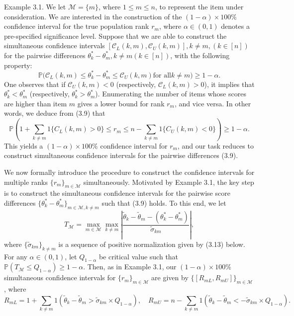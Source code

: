 Example 3.1. We let \(\mathcal{M} = \{m\}\), where \(1 \leq m \leq n\), to represent the item under consideration. We are interested in the construction of the \((1 - \alpha) \times 100\%\) confidence interval for the true population rank \(r_{m}\), where \(\alpha \in (0,1)\) denotes a pre-specified significance level. Suppose that we are able to construct the simultaneous confidence intervals \([\mathcal{C}_L(k,m), \mathcal{C}_U(k,m)], k \neq m, (k \in [n])\) for the pairwise differences \(\theta_{k}^{*} - \theta_{m}^{*}, k \neq m (k \in [n])\), with the following property:
\[
\mathbb{P}\Big(\mathcal{C}_L(k,m) \leq \theta_k^* - \theta_m^* \leq \mathcal{C}_U(k,m) \text{for all} k \neq m\Big) \geq 1 - \alpha . \tag{3.9}
\]
One observes that if \(\mathcal{C}_U(k,m) < 0\) (respectively, \(\mathcal{C}_L(k,m) > 0\)), it implies that \(\theta_k^* < \theta_m^*\) (respectively, \(\theta_k^* > \theta_m^*\)). Enumerating the number of items whose scores are higher than item \(m\) gives a lower bound for rank \(r_{m}\), and vice versa. In other words, we deduce from (3.9) that
\[
\mathbb{P}\left(1 + \sum_{k \neq m} 1 \{C_L(k,m) > 0\} \leq r_m \leq n - \sum_{k \neq m} 1 \{C_U(k,m) < 0\}\right) \geq 1 - \alpha . \tag{3.10}
\]
This yields a \((1 - \alpha) \times 100\%\) confidence interval for \(r_{m}\), and our task reduces to construct simultaneous confidence intervals for the pairwise differences (3.9).

We now formally introduce the procedure to construct the confidence intervals for multiple ranks \(\{r_m\}_{m \in \mathcal{M}}\) simultaneously. Motivated by Example 3.1, the key step is to construct the simultaneous confidence intervals for the pairwise score differences \(\{\theta_k^* - \theta_m^*\}_{m \in \mathcal{M}, k \neq m}\) such that (3.9) holds. To this end, we let
\[
T_{\mathcal{M}} = \max_{m \in \mathcal{M}} \max_{k \neq m} \left| \frac{\widetilde{\theta}_k - \widetilde{\theta}_m - (\theta_k^* - \theta_m^*)}{\widetilde{\sigma}_{km}} \right|, \tag{3.11}
\]
where \(\{\widetilde{\sigma}_{km}\}_{k \neq m}\) is a sequence of positive normalization given by (3.13) below. For any \(\alpha \in (0,1)\), let \(Q_{1 - \alpha}\) be critical value such that \(\mathbb{P}(T_{\mathcal{M}} \leq Q_{1 - \alpha}) \geq 1 - \alpha\). Then, as in Example 3.1, our \((1 - \alpha) \times 100\%\) simultaneous confidence intervals for \(\{r_m\}_{m \in \mathcal{M}}\) are given by \(\{[R_{mL}, R_{mU}] \}_{m \in \mathcal{M}}\), where
\[
R_{mL} = 1 + \sum_{k \neq m} 1 \left(\widetilde{\theta}_k - \widetilde{\theta}_m > \widetilde{\sigma}_{km} \times Q_{1 - \alpha}\right), \quad R_{mU} = n - \sum_{k \neq m} 1 \left(\widetilde{\theta}_k - \widetilde{\theta}_m < -\widetilde{\sigma}_{km} \times Q_{1 - \alpha}\right).
\]

